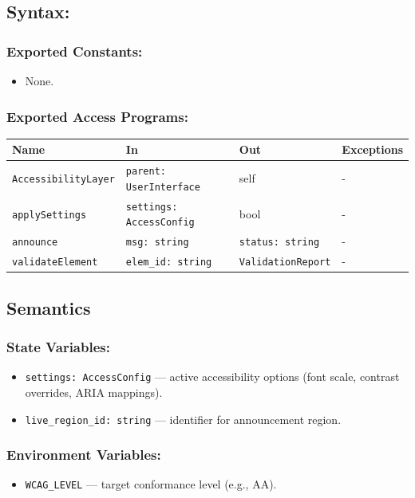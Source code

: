 \documentclass[12pt, titlepage]{article}
\begin{document}
\subsection{Syntax:}

\subsubsection{Exported Constants:}
\begin{itemize}
  \item None.
\end{itemize}

\subsubsection{Exported Access Programs:}

\begin{tabular}{|l|l|l|l|}
\hline
\textbf{Name} & \textbf{In} & \textbf{Out} & \textbf{Exceptions} \\ \hline
\texttt{AccessibilityLayer} & \texttt{parent: UserInterface} & self & - \\ 
\texttt{applySettings} & \texttt{settings: AccessConfig} & bool & - \\ 
\texttt{announce} & \texttt{msg: string} & \texttt{status: string} & - \\ 
\texttt{validateElement} & \texttt{elem\_id: string} & \texttt{ValidationReport} & - \\ \hline
\end{tabular}

\subsection{Semantics}

\subsubsection{State Variables:}
\begin{itemize}
  \item \texttt{settings: AccessConfig} — active accessibility options (font scale, contrast overrides, ARIA mappings).
  \item \texttt{live\_region\_id: string} — identifier for announcement region.
\end{itemize}

\subsubsection{Environment Variables:}
\begin{itemize}
  \item \texttt{WCAG\_LEVEL} — target conformance level (e.g., AA).
\end{itemize}
\end{document}

